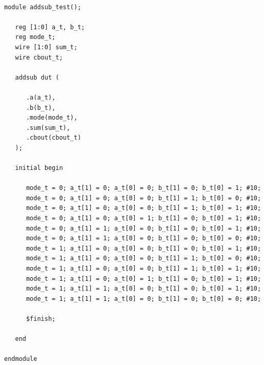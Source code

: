 \documentclass[11pt]{article}
\begin{document}
\begin{lstlisting}

module addsub_test();

   reg [1:0] a_t, b_t;
   reg mode_t;
   wire [1:0] sum_t;
   wire cbout_t;

   addsub dut (

      .a(a_t),
      .b(b_t),
      .mode(mode_t),
      .sum(sum_t),
      .cbout(cbout_t)
   );

   initial begin 

      mode_t = 0; a_t[1] = 0; a_t[0] = 0; b_t[1] = 0; b_t[0] = 1; #10;
      mode_t = 0; a_t[1] = 0; a_t[0] = 0; b_t[1] = 1; b_t[0] = 0; #10;
      mode_t = 0; a_t[1] = 0; a_t[0] = 0; b_t[1] = 1; b_t[0] = 1; #10;
      mode_t = 0; a_t[1] = 0; a_t[0] = 1; b_t[1] = 0; b_t[0] = 1; #10;
      mode_t = 0; a_t[1] = 1; a_t[0] = 0; b_t[1] = 0; b_t[0] = 1; #10;
      mode_t = 0; a_t[1] = 1; a_t[0] = 0; b_t[1] = 0; b_t[0] = 0; #10;
      mode_t = 1; a_t[1] = 0; a_t[0] = 0; b_t[1] = 0; b_t[0] = 1; #10;
      mode_t = 1; a_t[1] = 0; a_t[0] = 0; b_t[1] = 1; b_t[0] = 0; #10;
      mode_t = 1; a_t[1] = 0; a_t[0] = 0; b_t[1] = 1; b_t[0] = 1; #10;
      mode_t = 1; a_t[1] = 0; a_t[0] = 1; b_t[1] = 0; b_t[0] = 1; #10;
      mode_t = 1; a_t[1] = 1; a_t[0] = 0; b_t[1] = 0; b_t[0] = 1; #10;
      mode_t = 1; a_t[1] = 1; a_t[0] = 0; b_t[1] = 0; b_t[0] = 0; #10;

      $finish;

   end

endmodule

\end{lstlisting}
\end{document}
